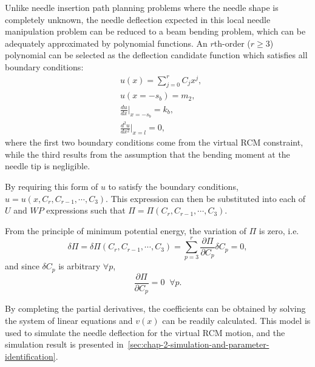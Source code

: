 Unlike needle insertion path planning problems where the needle shape is completely unknown, the needle deflection expected in this local needle manipulation problem can be reduced to a beam bending problem, which can be adequately approximated by polynomial functions. An $r$th-order ($r \geq 3$) polynomial can be selected as the deflection candidate function which satisfies all boundary conditions:
\begin{align}
  &u(x)= \sum_{j=0}^r C_j x^j,\\
  &u(x = -s_b)= m_2, \\
  &\frac{du}{dx}\biggr\rvert_{x=-s_b}= k_b, \\
  &\frac{d^2u}{dx^2}\biggr\rvert_{x=l}= 0,
\end{align}
where the first two boundary conditions come from the virtual RCM constraint, while the third results from the assumption that the bending moment at the needle tip is negligible. 

By requiring this form of $u$ to satisfy the boundary conditions, $u = u(x, C_r, C_{r-1}, \cdots, C_3)$. This expression can then be substituted into each of $U$ and $WP$ expressions such that $\Pi = \Pi(C_r, C_{r-1}, \cdots, C_3)$.

From the principle of minimum potential energy, the variation of $\Pi$ is zero, i.e.
\begin{equation}
  \delta\Pi = \delta\Pi(C_r, C_{r-1}, \cdots, C_3) = \sum_{p=3}^{r} \frac{\partial\Pi}{\partial C_p}\delta C_p= 0,
\end{equation}
and since $\delta C_p$ is arbitrary $\forall p$,
\begin{equation}
  \frac{\partial\Pi}{\partial C_p} = 0 \;\; \forall p.
\end{equation}

By completing the partial derivatives, the coefficients can be obtained by solving the system of linear equations and $v(x)$ can be readily calculated. This model is used to simulate the needle deflection for the virtual RCM motion, and the simulation result is presented in~\cref{sec:chap-2-simulation-and-parameter-identification}.


